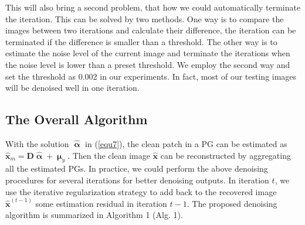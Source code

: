 \documentclass[10pt,twocolumn,letterpaper]{article}
\begin{document}
This will also bring a second problem, that how we could automatically terminate the iteration. This can be solved by two methods. One way is to compare the images between two iterations and calculate their difference, the iteration can be terminated if the difference is smaller than a threshold. The other way is to estimate the noise level of the current image and terminate the iterations when the noise level is lower than a preset threshold. We employ the second way and set the threshold as 0.002 in our experiments. In fact, most of our testing images will be denoised well in one iteration.


\subsection{The Overall Algorithm}
With the solution $\hat{\boldsymbol{\upalpha}}$ in (\ref{equ7}), the clean patch in a PG can be estimated as $\hat{\mathbf{x}}_{m}=\mathbf{D}\hat{\boldsymbol{\upalpha}}+\boldsymbol{\upmu}_{y}$. Then the clean image $\hat{\mathbf{x}}$ can be reconstructed by aggregating all the estimated PGs. In practice, we could perform the above denoising procedures for several iterations for better denoising outputs. In iteration $t$, we use the iterative regularization strategy \cite{osher2005iterative} to add back to the recovered image $\hat{\mathbf{x}}^{(t-1)}$ some estimation residual in iteration $t-1$. The proposed denoising algorithm is summarized in Algorithm 1 (Alg. 1).
\end{document}
